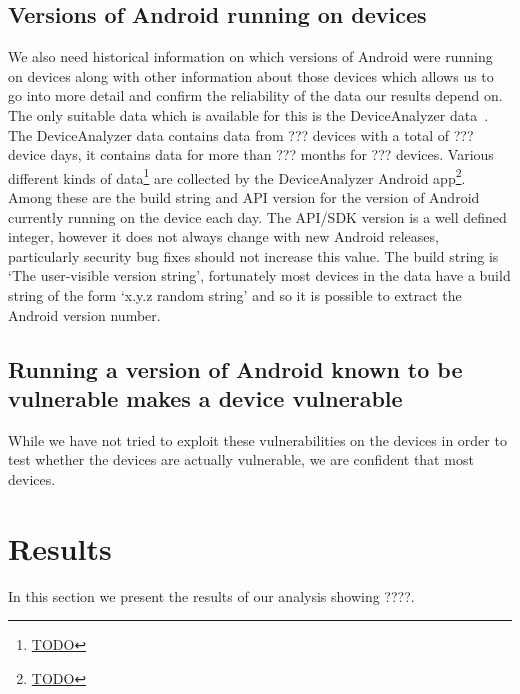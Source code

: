 \documentclass[conference,a4paper,twoside]{IEEEtran}
\begin{document}
\subsection{Versions of Android running on devices}
We also need historical information on which versions of Android were running on devices along with other information about those devices which allows us to go into more detail and confirm the reliability of the data our results depend on.
The only suitable data which is available for this is the DeviceAnalyzer data~\cite{TODO}.
The DeviceAnalyzer data contains data from ??? devices with a total of ??? device days, it contains data for more than ??? months for ??? devices.
Various different kinds of data\footnote{\url{TODO}} are collected by the DeviceAnalyzer Android app\footnote{\url{TODO}}.
Among these are the build string and API version for the version of Android currently running on the device each day.
The API/SDK version is a well defined integer, however it does not always change with new Android releases, particularly security bug fixes should not increase this value.
The build string is `The user-visible version string', fortunately most devices in the data have a build string of the form `x.y.z random string' and so it is possible to extract the Android version number.

\subsection{Running a version of Android known to be vulnerable makes a device vulnerable}
While we have not tried to exploit these vulnerabilities on the devices in order to test whether the devices are actually vulnerable, we are confident that most devices.

\section{Results}
\label{sec:results}
In this section we present the results of our analysis showing ????. %
\end{document}
